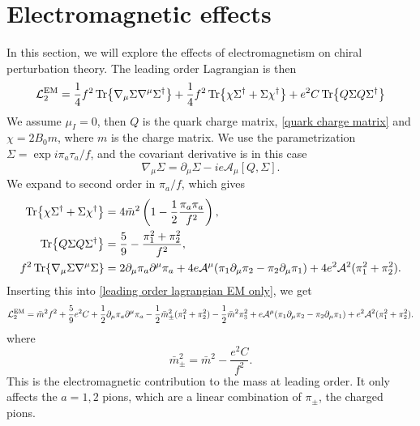 \section{Electromagnetic effects}

In this section, we will explore the effects of electromagnetism on chiral perturbation theory.
The leading order Lagrangian is then~\autocite{eckerRoleResonancesChiral1989,urechVirtualPhotonsChiral1995}
%
\begin{equation}
    \label{leading order lagrangian EM only}
    \mathcal{L}_2^{\text{EM}}
    = 
    \frac{1}{4}f^2 
    \Tr{
        \nabla_\mu \Sigma \nabla^\mu \Sigma^\dagger
    }
    +
    \frac{1}{4}f^2 
    \Tr{
        \chi \Sigma^\dagger + \Sigma\chi^\dagger
    }
    +
    e^2 C
    \Tr{Q \Sigma Q \Sigma^\dagger}
\end{equation}
%
We assume $\mu_I = 0$, then $Q$ is the quark charge matrix, \autoref{quark charge matrix} and $\chi = 2B_0 m$, where $m$ is the charge matrix.
We use the parametrization $\Sigma = \exp{i \pi_a \tau_a / f}$, and the covariant derivative is in this case
%
\begin{equation}
    \nabla_\mu \Sigma = \partial_\mu \Sigma - i e \mathcal A_\mu [Q, \Sigma].
\end{equation}
%
We expand to second order in $\pi_a/f$, which gives
%
\begin{align}
    \Tr{\chi \Sigma^\dagger + \Sigma \chi^\dagger}
    & = 4 \bar m^2\left(1 - \frac{1}{2} \frac{\pi_a \pi_a}{f^2}\right), \\
    \Tr{Q \Sigma Q \Sigma^\dagger}
    & = \frac{5}{9} - \frac{\pi_1^2 + \pi_2^2}{f^2}, \\
    f^2 \Tr{\nabla_\mu \Sigma \nabla^\mu \Sigma}
    &=
    2\partial_\mu \pi_a\partial^\mu \pi_a
    + 4 e \mathcal A^\mu (\pi_1 \partial_\mu \pi_2 -\pi_2 \partial_\mu \pi_1)
    + 4 e^2 \mathcal A^2 (\pi_1^2 + \pi_2^2).
\end{align}
%
Inserting this into \autoref{leading order lagrangian EM only}, we get
%
\begin{equation}
    \mathcal{L}_2^\text{EM}
    = \bar m^2 f^2 + \frac{5}{9}e^2 C
    + \frac{1}{2}\partial_\mu \pi_a \partial^\mu \pi_a
    - \frac{1}{2} \bar m_\pm^2 (\pi_1^2 + \pi_2^2) 
    - \frac{1}{2}\bar m^2 \pi_3^2
    + e \mathcal A^\mu (\pi_1 \partial_\mu \pi_2 -\pi_2 \partial_\mu \pi_1)
    + e^2 \mathcal A^2 (\pi_1^2 + \pi_2^2).
\end{equation}
%
where
\begin{equation}
    \bar m_\pm^2 = \bar m^2 - \frac{e^2 C}{f^2}.
\end{equation}
%
This is the electromagnetic contribution to the mass at leading order.
It only affects the $a = 1, 2$ pions, which are a linear combination of $\pi_\pm$, the charged pions.

